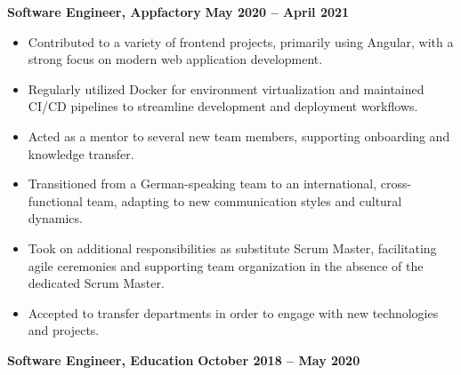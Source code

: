 \documentclass[10pt, a4paper]{cvhari}
\begin{document}
\smallskip
\divider
\smallskip

    \textbf{Software Engineer, Appfactory} \hfill \textbf{May 2020 -- April 2021}

    \vspace{0.2em}
    \begin{itemize}
        \item Contributed to a variety of frontend projects, primarily using Angular, with a strong focus on modern web application development.

        \item Regularly utilized Docker for environment virtualization and maintained CI/CD pipelines to streamline development and deployment workflows.

        \item Acted as a mentor to several new team members, supporting onboarding and knowledge transfer.

        \item Transitioned from a German-speaking team to an international, cross-functional team, adapting to new communication styles and cultural dynamics.

        \item Took on additional responsibilities as substitute Scrum Master, facilitating agile ceremonies and supporting team organization in the absence of the dedicated Scrum Master.

        \item Accepted to transfer departments in order to engage with new technologies and projects.

    \end{itemize}


\smallskip
\divider
\smallskip

    \textbf{Software Engineer, Education} \hfill \textbf{October 2018 -- May 2020}
\end{document}
